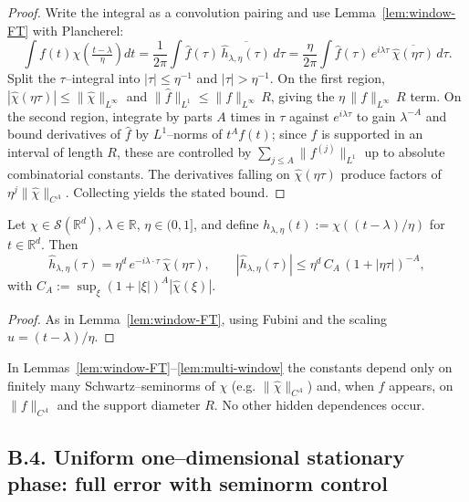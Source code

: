 \begin{proof}
Write the integral as a convolution pairing and use Lemma~\ref{lem:window-FT} with Plancherel:
\[
\int f(t) \chi\!\left(\tfrac{t-\lambda}{\eta}\right) dt
= \frac{1}{2\pi}\int \widehat{f}(\tau)\, \overline{\widehat{h}_{\lambda,\eta}(\tau)}\, d\tau
= \frac{\eta}{2\pi}\int \widehat{f}(\tau)\, e^{i\lambda \tau}\, \overline{\widehat{\chi}(\eta\tau)}\, d\tau.
\]
Split the $\tau$–integral into $|\tau|\le \eta^{-1}$ and $|\tau|>\eta^{-1}$. On the first region, $|\widehat{\chi}(\eta\tau)|\le \|\widehat{\chi}\|_{L^\infty}$ and $\|\widehat{f}\|_{L^1}\le \|f\|_{L^\infty}\, R$, giving the $\eta\,\|f\|_{L^\infty}\, R$ term. On the second region, integrate by parts $A$ times in $\tau$ against $e^{i\lambda \tau}$ to gain $\lambda^{-A}$ and bound derivatives of $\widehat{f}$ by $L^1$–norms of $t^A f(t)$; since $f$ is supported in an interval of length $R$, these are controlled by $\sum_{j\le A}\|f^{(j)}\|_{L^1}$ up to absolute combinatorial constants. The derivatives falling on $\widehat{\chi}(\eta\tau)$ produce factors of $\eta^j \|\widehat{\chi}\|_{C^{A}}$. Collecting yields the stated bound.
\end{proof}

\begin{lemma}
\label{lem:multi-window}
Let $\chi\in\mathcal{S}(\mathbb{R}^d)$, $\lambda\in\mathbb{R}$, $\eta\in(0,1]$, and define $h_{\lambda,\eta}(t):=\chi((t-\lambda)/\eta)$ for $t\in\mathbb{R}^d$. Then
\[
\widehat{h}_{\lambda,\eta}(\tau)=\eta^{d}\, e^{-i\lambda \cdot \tau}\,\widehat{\chi}(\eta \tau),\qquad
|\widehat{h}_{\lambda,\eta}(\tau)| \le \eta^{d}\, C_{A}\, (1+|\eta \tau|)^{-A},
\]
with $C_A:=\sup_{\xi} (1+|\xi|)^A |\widehat{\chi}(\xi)|$.
\end{lemma}

\begin{proof}
As in Lemma~\ref{lem:window-FT}, using Fubini and the scaling $u=(t-\lambda)/\eta$.
\end{proof}

\begin{remark}
In Lemmas~\ref{lem:window-FT}–\ref{lem:multi-window} the constants depend only on finitely many Schwartz–seminorms of $\chi$ (e.g. $\|\widehat{\chi}\|_{C^{A}}$) and, when $f$ appears, on $\|f\|_{C^{A}}$ and the support diameter $R$. No other hidden dependences occur.
\end{remark}

\subsection*{B.4. Uniform one–dimensional stationary phase: full error with seminorm control}
\label{appB:uniform-1d}

